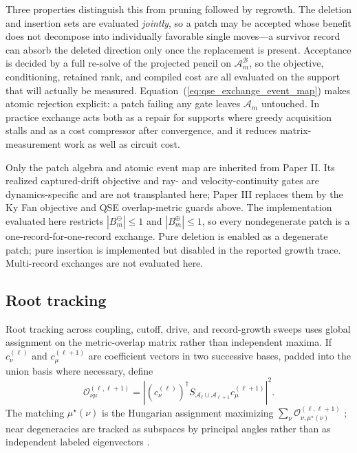 \documentclass[
  reprint,
  amsmath,
  amssymb,
  aps,
  pra,
  nofootinbib,
  superscriptaddress,
  floatfix
]{revtex4-2}
\newcommand{\Acal}{\mathcal{A}}
\begin{document}
Three properties distinguish this from pruning followed by regrowth.  The deletion and insertion sets are evaluated \emph{jointly}, so a patch may be accepted whose benefit does not decompose into individually favorable single moves---a survivor record can absorb the deleted direction only once the replacement is present.  Acceptance is decided by a full re-solve of the projected pencil on $\Acal_m^{\mathcal B}$, so the objective, conditioning, retained rank, and compiled cost are all evaluated on the support that will actually be measured.  Equation~(\ref{eq:qse_exchange_event_map}) makes atomic rejection explicit: a patch failing any gate leaves $\Acal_m$ untouched.  In practice exchange acts both as a repair for supports where greedy acquisition stalls and as a cost compressor after convergence, and it reduces matrix-measurement work as well as circuit cost.

Only the patch algebra and atomic event map are inherited from Paper II.  Its realized captured-drift objective and ray- and velocity-continuity gates are dynamics-specific and are not transplanted here; Paper III replaces them by the Ky Fan objective and QSE overlap-metric guards above.  The implementation evaluated here restricts $|B_m^{\ominus}|\le 1$ and $|B_m^{\oplus}|\le 1$, so every nondegenerate patch is a one-record-for-one-record exchange.  Pure deletion is enabled as a degenerate patch; pure insertion is implemented but disabled in the reported growth trace.  Multi-record exchanges are not evaluated here.

\subsection{Root tracking}

Root tracking across coupling, cutoff, drive, and record-growth sweeps uses global assignment on the metric-overlap matrix rather than independent maxima.  If $c_\nu^{(\ell)}$ and $c_\mu^{(\ell+1)}$ are coefficient vectors in two successive bases, padded into the union basis where necessary, define
\begin{equation}
\mathcal O_{\nu\mu}^{(\ell,\ell+1)}
=
\left|
(c_\nu^{(\ell)})^\dagger
S_{\Acal_\ell\cup\Acal_{\ell+1}}
c_\mu^{(\ell+1)}
\right|^2 .
\label{eq:root_matching}
\end{equation}
The matching $\mu^\star(\nu)$ is the Hungarian assignment maximizing
$\sum_\nu \mathcal O_{\nu,\mu^\star(\nu)}^{(\ell,\ell+1)}$ \cite{Kuhn1955Hungarian}; near degeneracies are tracked as subspaces by principal angles rather than as independent labeled eigenvectors \cite{DavisKahan1970}.
\end{document}
